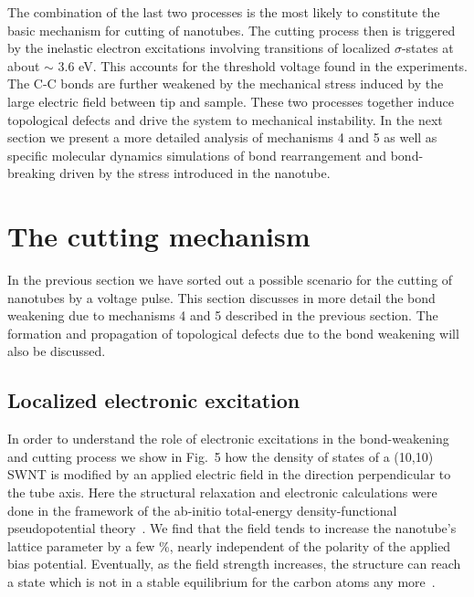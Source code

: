 \begin{multicols}{2}
The combination of the last two processes is the most likely to
constitute the basic mechanism for cutting of nanotubes. The
cutting process then is triggered by the inelastic electron
excitations involving transitions of localized $\sigma$-states at
about $\sim$ 3.6 eV. This accounts for the threshold voltage found
in the experiments. The C-C bonds are further weakened by the
mechanical stress induced by the large electric field between tip
and sample. These two processes together induce topological
defects and drive the system to mechanical instability. In the
next section we present a more detailed analysis of mechanisms 4
and 5 as well as specific molecular dynamics simulations of bond
rearrangement and bond-breaking driven by the stress introduced in
the nanotube.

\section{The cutting mechanism}

In the previous section we have sorted out a possible scenario for
the cutting of nanotubes by a voltage pulse. This section
discusses in more detail the bond weakening due to mechanisms 4
and 5 described in the previous section. The formation and
propagation of topological defects due to the bond weakening will
also be discussed.

\subsection{Localized electronic excitation}

In order to understand the role of electronic excitations in the
bond-weakening\cite{dimer} and cutting process we show in Fig.~5
how the density of states of a (10,10) SWNT is modified by an
applied electric field in the direction perpendicular to the tube
axis. Here the structural relaxation and electronic calculations
were done in the framework of the ab-initio total-energy
density-functional pseudopotential theory~\cite{ar3}. We find that
the field tends to increase the nanotube's lattice parameter by a
few \%, nearly independent of the polarity of the applied bias
potential. Eventually, as the field strength increases, the
structure can reach a state which is not in a stable equilibrium
for the carbon atoms any more~\cite{Tomanek}.


\end{multicols}
